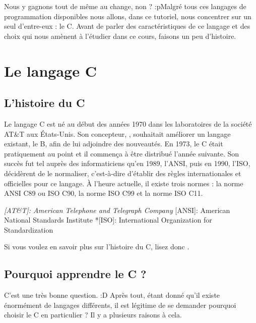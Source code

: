 Nous y gagnons tout de même au change, non ? :pMalgré tous ces
langages de programmation disponibles nous allons, dans ce tutoriel,
nous concentrer sur un seul d'entre-eux : le C. Avant de parler des
caractéristiques de ce langage et des choix qui nous amènent à
l'étudier dans ce cours, faisons un peu d'histoire.

\section{Le langage C}
\label{le-langage-C}

\subsection{L'histoire du C}
\label{lhistoire-du-c}

Le langage C est né au début des années 1970 dans les laboratoires de
la société AT\&T aux États-Unis. Son concepteur,
, souhaitait améliorer un langage existant, le B, afin de
lui adjoindre des nouveautés. En 1973, le C était pratiquement au
point et il commença à être distribué l'année suivante. Son succès fut
tel auprès des informaticiens qu'en 1989, l'ANSI, puis en 1990, l'ISO,
décidèrent de le normaliser, c'est-à-dire d'établir des règles
internationales et officielles pour ce langage. À l'heure actuelle, il
existe trois normes : la norme ANSI C89 ou ISO C90, la norme ISO C99
et la norme ISO C11.

\emph{{[}AT\&T{]}: American Telephone and Telegraph Company
}{[}ANSI{]}: American National Standards Institute *{[}ISO{]}:
International Organization for Standardization

\begin{infobox}
Si vous voulez en savoir plus sur
l'histoire du C, lisez donc
.
\end{infobox}

\subsection{Pourquoi apprendre le C ?}
\label{pourquoi-apprendre-le-c}

C'est une très bonne question. :D Après tout, étant donné qu'il existe
énormément de langages différents, il est légitime de se demander
pourquoi choisir le C en particulier ? Il y a plusieurs raisons à
cela.

